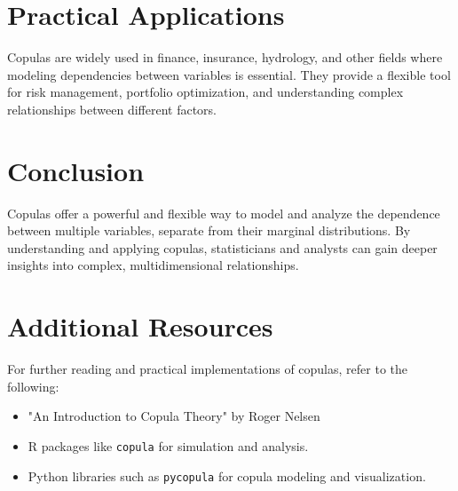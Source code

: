 \documentclass{article}
\begin{document}
\section{Practical Applications}
Copulas are widely used in finance, insurance, hydrology, and other fields where modeling dependencies between variables is essential. They provide a flexible tool for risk management, portfolio optimization, and understanding complex relationships between different factors.

\section{Conclusion}
Copulas offer a powerful and flexible way to model and analyze the dependence between multiple variables, separate from their marginal distributions. By understanding and applying copulas, statisticians and analysts can gain deeper insights into complex, multidimensional relationships.

\printbibliography

\newpage
\appendix
\section{Additional Resources}
For further reading and practical implementations of copulas, refer to the following:
\begin{itemize}
    \item "An Introduction to Copula Theory" by Roger Nelsen
    \item R packages like \texttt{copula} for simulation and analysis.
    \item Python libraries such as \texttt{pycopula} for copula modeling and visualization.
\end{itemize}
\end{document}

